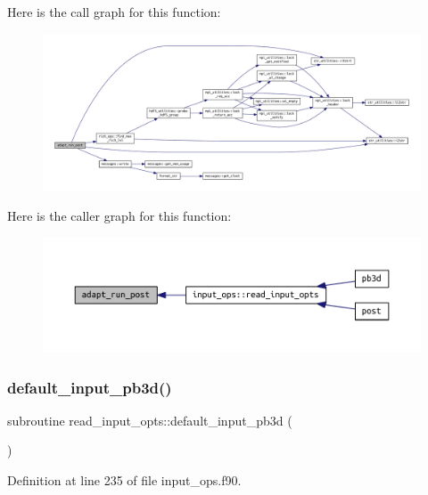 Here is the call graph for this function\+:
\nopagebreak
\begin{figure}[H]
\begin{center}
\leavevmode
\includegraphics[width=350pt]{input__ops_8f90_a0ba5a762c885daaf5fcc2c60ab81c535_cgraph}
\end{center}
\end{figure}
Here is the caller graph for this function\+:
\nopagebreak
\begin{figure}[H]
\begin{center}
\leavevmode
\includegraphics[width=350pt]{input__ops_8f90_a0ba5a762c885daaf5fcc2c60ab81c535_icgraph}
\end{center}
\end{figure}
\mbox{\label{input__ops_8f90_a5137b6d81dcbf50b3eb6a000f6b8d2b8}} 
\subsubsection{\texorpdfstring{default\+\_\+input\+\_\+pb3d()}{default\_input\_pb3d()}}
{\footnotesize\ttfamily subroutine read\+\_\+input\+\_\+opts\+::default\+\_\+input\+\_\+pb3d (\begin{DoxyParamCaption}{ }\end{DoxyParamCaption})}



Definition at line 235 of file input\+\_\+ops.\+f90.

